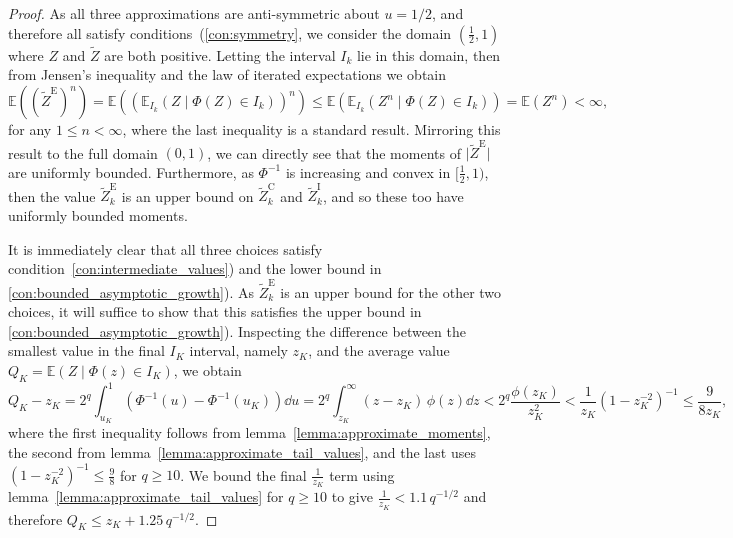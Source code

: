 \documentclass[manuscript,review]{acmart}
\begin{document}
\begin{proof}
As all three approximations are anti-symmetric about $u = 1/2$, and therefore all satisfy conditions~(\ref{con:symmetry}, we consider the domain $ (\tfrac{1}{2}, 1) $ where $ Z $ and $ \widetilde{Z} $ are both positive. Letting the interval $ I_k $ lie in this domain, then from Jensen's inequality and the law of iterated expectations we obtain 
\begin{equation*}
\mathbb{E}((\widetilde{Z}^{\mathrm{E}})^n) = \mathbb{E}((\mathbb{E}_{I_k}(Z \mid \Phi(Z) \in I_k))^n) \leq \mathbb{E}(\mathbb{E}_{I_k}(Z^n \mid \Phi(Z) \in I_k)) =  \mathbb{E}(Z^n) < \infty,
\end{equation*}
for any $ 1\leq n < \infty $, where the last inequality is a standard result. Mirroring this result to the full domain $ (0, 1) $, we can directly see that the moments of $ \lvert \widetilde{Z}^{\mathrm{E}} \rvert $ are uniformly bounded. Furthermore, as $ \Phi^{-1} $ is increasing and convex in $ [\tfrac{1}{2}, 1) $, then the value $ \widetilde{Z}_k^\mathrm{E} $ is an upper bound on $ \widetilde{Z}_k^\mathrm{C} $ and $ \widetilde{Z}_k^\mathrm{I} $, and so these too have uniformly bounded moments.

It is immediately clear that all three choices satisfy condition~\ref{con:intermediate_values}) and the lower bound in \ref{con:bounded_asymptotic_growth}). As $ \widetilde{Z}_k^\mathrm{E} $ is an upper bound for the other two choices, it will suffice to show that this satisfies the upper bound in \ref{con:bounded_asymptotic_growth}). Inspecting the difference between the smallest value in the final $ I_K $ interval, namely $ z_K $, and the average value $ Q_K = \mathbb{E}(Z \mid \Phi(z) \in I_K) $, we obtain
\begin{equation*}
Q_K - z_K = 2^q \int_{u_K}^{1} \left(\Phi^{-1}(u) - \Phi^{-1}(u_K)\right) \dd{u} = 2^q \int_{z_K}^{\infty} (z - z_K)\, \phi(z) \dd{z} <  2^q \dfrac{\phi(z_K)}{z_K^2} < \dfrac{1}{z_K} (1 - z_K^{-2})^{-1} \leq \dfrac{9}{8 z_K},
\end{equation*}
where the first inequality follows from lemma~\ref{lemma:approximate_moments}, the second from lemma~\ref{lemma:approximate_tail_values}, and the last uses $ (1 - z_K^{-2})^{-1} \leq \tfrac{9}{8} $ for $ q \geq 10 $. We bound the final $ \tfrac{1}{z_K} $ term using lemma~\ref{lemma:approximate_tail_values} for $q\geq  10$ to give $ \tfrac{1}{z_K} < 1.1 \, q^{-1/2}$ 
and therefore $ Q_K \leq z_K + 1.25 \,q^{-1/2} $. \qedhere
\end{proof}
\end{document}

